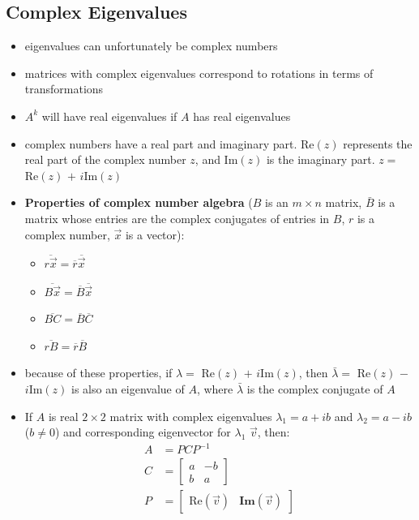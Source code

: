 \documentclass[a4paper,12pt]{article}
\theoremstyle{definition}
\theoremstyle{definition}
\begin{document}
	\subsection{Complex Eigenvalues}
	\begin{itemize}
		\item eigenvalues can unfortunately be complex numbers
		
		\item matrices with complex eigenvalues correspond to rotations in terms of transformations
		
		\item $A^k$ will have real eigenvalues if $A$ has real eigenvalues
		
		\item complex numbers have a real part and imaginary part. Re$(z)$ represents the real part of the complex number $z$, and Im$(z)$ is the imaginary part. $z =$ Re$(z)$ $+$ $i$Im$(z)$
		
		\item \textbf{Properties of complex number algebra} ($B$ is an $m \times n$ matrix, $\bar{B}$ is a matrix whose entries are the complex conjugates of entries in $B$, $r$ is a complex number, $\vec{x}$ is a vector):
		
		\begin{itemize}
			\item $\overline{r\vec{x}} = \overline{r}\overline{\vec{x}}$
			
			\item $\overline{B\vec{x}} = \overline{B}\overline{\vec{x}}$
			
			\item $\overline{BC} = \overline{B}\overline{C}$
			
			\item $\overline{rB} = \overline{r}\overline{B}$
		\end{itemize}
		
		\item because of these properties, if $\lambda =$ Re$(z)$ $+$ $i$Im$(z)$, then $\bar{\lambda} =$ Re$(z)$ $-$ $i$Im$(z)$ is also an eigenvalue of $A$, where $\bar{\lambda}$ is the complex conjugate of $A$
		
		\item If $A$ is real $2 \times 2$ matrix with complex eigenvalues $\lambda_1 = a + ib$ and $\lambda_2 = a - ib$ ($b \neq 0$) and corresponding eigenvector for $\lambda_1$ $\vec{v}$, then:
		\begin{align*}
			A &= PCP^{-1}\\
			C &=
			\begin{bmatrix}
				a & -b\\
				b & a
			\end{bmatrix}\\
			P &=
			\begin{bmatrix}
				\text{Re}(\vec{v}) & \textbf{Im}(\vec{v})
			\end{bmatrix}
		\end{align*}
	\end{itemize}
	\newpage
	
\end{document}
